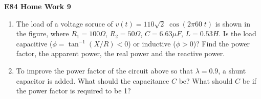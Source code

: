 \usepackage{html}

\begin{center}
{\Large \bf E84 Home Work 9}
\end{center}
\begin{enumerate}

\item The load of a voltage soruce of $v(t)=110\sqrt{2} \;\cos(2\pi 60\;t)$
is shown in the figure, where $R_1=100\Omega$, $R_2=50\Omega$, $C=6.63\mu F$, 
$L=0.53 H$. Is the load capacitive ($\phi=\tan^{-1}(X/R)<0$) or inductive 
($\phi>0$)? Find the power factor, the apparent power, the real power and 
the reactive power. 


%   

\item To improve the power factor of the circuit above so that $\lambda=0.9$, a 
shunt capacitor is added. What should the capacitance $C$ be? What should $C$ be 
if the power factor is required to be 1?


%  


\end{enumerate}
